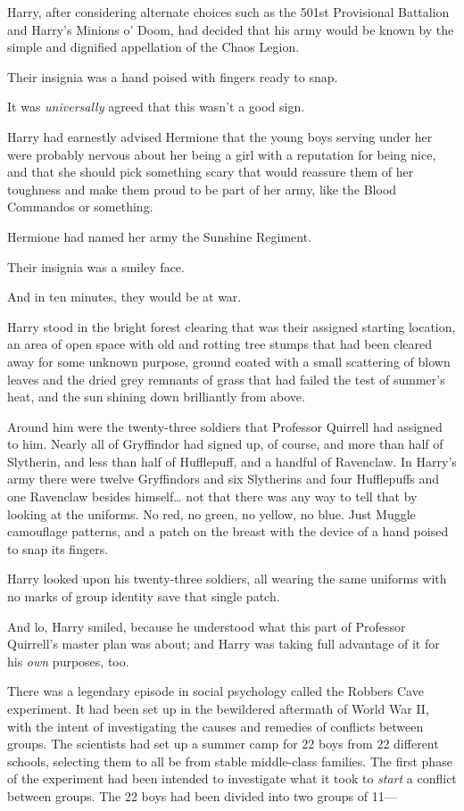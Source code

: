 Harry, after considering alternate choices such as the 501st Provisional
Battalion and Harry's Minions o' Doom, had decided that his army would be known
by the simple and dignified appellation of the Chaos Legion.

Their insignia was a hand poised with fingers ready to snap.

It was \emph{universally} agreed that this wasn't a good sign.

Harry had earnestly advised Hermione that the young boys serving under her were
probably nervous about her being a girl with a reputation for being nice, and
that she should pick something scary that would reassure them of her toughness
and make them proud to be part of her army, like the Blood Commandos or
something.

Hermione had named her army the Sunshine Regiment.

Their insignia was a smiley face.

And in ten minutes, they would be at war.

Harry stood in the bright forest clearing that was their assigned starting
location, an area of open space with old and rotting tree stumps that had been
cleared away for some unknown purpose, ground coated with a small scattering of
blown leaves and the dried grey remnants of grass that had failed the test of
summer's heat, and the sun shining down brilliantly from above.

Around him were the twenty-three soldiers that Professor Quirrell had assigned
to him. Nearly all of Gryffindor had signed up, of course, and more than half
of Slytherin, and less than half of Hufflepuff, and a handful of Ravenclaw. In
Harry's army there were twelve Gryffindors and six Slytherins and four
Hufflepuffs and one Ravenclaw besides himself{\ldots} not that there was any
way to tell that by looking at the uniforms. No red, no green, no yellow, no
blue. Just Muggle camouflage patterns, and a patch on the breast with the
device of a hand poised to snap its fingers.

Harry looked upon his twenty-three soldiers, all wearing the same uniforms with
no marks of group identity save that single patch.

And lo, Harry smiled, because he understood what this part of Professor
Quirrell's master plan was about; and Harry was taking full advantage of it for
his \emph{own} purposes, too.

There was a legendary episode in social psychology called the Robbers Cave
experiment. It had been set up in the bewildered aftermath of World War II,
with the intent of investigating the causes and remedies of conflicts between
groups. The scientists had set up a summer camp for 22 boys from 22 different
schools, selecting them to all be from stable middle-class families. The first
phase of the experiment had been intended to investigate what it took to
\emph{start} a conflict between groups. The 22 boys had been divided into two
groups of 11---


